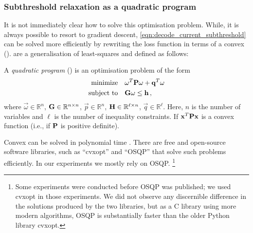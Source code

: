 \subsubsection{Subthreshold relaxation as a quadratic program}
It is not immediately clear how to solve this optimisation problem.
While, it is always possible to resort to gradient descent, \cref{eqn:decode_current_subthreshold} can be solved more efficiently by rewriting the loss function in terms of a convex \qprog (\QP).
\QPpl are a generalisation of least-squares and defined as follows:
\begin{definition}
\label{def:qp}
A \emph{quadratic program} (\QP) is an optimisation problem of the form \citep[adapted in slightly simplified form from][Section~4.4]{boyd2004convex}
\begin{align*}
	\text{minimize} &\quad
		\mathbf{\omega}^T \mathbf{P} \mathbf{\omega} + \mathbf{q}^T \mathbf{\omega} \\
	\text{subject to} &\quad
		\mathbf{G} \mathbf{\omega} \leq \mathbf{h} \,,
\end{align*}
where $\vec \omega \in \mathbb{R}^{n}$, $\mathbf{G} \in \mathbb{R}^{n \times n}$, $\vec p \in \mathbb{R}^{n}$, $\mathbf{H} \in \mathbb{R}^{\ell \times n}$, $\vec q \in \mathbb{R}^{\ell}$.
Here, $n$ is the number of variables and $\ell$ is the number of inequality constraints.
If $\mathbf{x}^T \mathbf{P} \mathbf{x}$ is a convex function (i.e., if $\mathbf{P}$ is positive definite).
\end{definition}

Convex \qprogpl can be solved in polynomial time \citep{kozlov1980polynomial}.
There are free and open-source software libraries, such as \enquote{cvxopt} \citep{vandenberghe2010cvxopt} and \enquote{OSQP}  \citep{stellato2020osqp} that solve such problems efficiently.
In our experiments we mostly rely on OSQP.%
\footnote{Some experiments were conducted before OSQP was published; we used cvxopt in those experiments. We did not observe any discernible difference in the solutions produced by the two libraries, but as a C library using more modern algorithms, OSQP is substantially faster than the older Python library cvxopt.}


